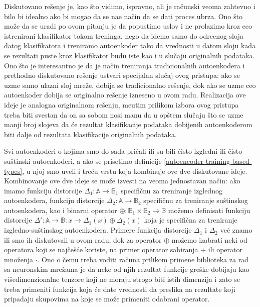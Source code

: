 \documentclass{article}
\begin{document}
	Diskutovano re\v senje je, kao \v sto vidimo, ispravno, ali je ra\v cunski veoma zahtevno i bilo bi idealno ako bi mogao da se na\dj e na\v cin da se dati proces ubrza.
	Ono \v sto mo\v ze da se uradi po ovom pitanju je da popustimo uslov i ne prolazimo kroz ceo istrenirani klasifikator tokom treninga, nego da idemo samo do odre\dj enog sloja datog klasifikatora i treniramo autoenkoder tako da vrednosti u datom sloju kada se rezultati puste kroz klasifikator budu iste kao i u slu\v caju originalnih podataka.
	Ono \v sto je interesantno je da je na\v cin treniranja tradicionalnih autoenkodera i prethodno diskutovano re\v senje ustvari specijalan slu\v caj ovog pristupa: ako se uzme samo ulazni sloj mre\v ze, dobija se tradicionalno re\v senje, dok ako se uzme ceo autoenkoder dobija se originalno re\v senje izneseno u ovom radu. 
	Realizacija ove ideje je analogna originalnom re\v senju, me\dj utim prilikom izbora ovog pristupa treba biti svestan da on sa sobom nosi manu da u op\v stem slu\v caju \v sto se uzme manji broj slojeva da \'ce rezultat klasifikacije podataka dobijenih autoenkoderom biti dalje od rezultata klasifikacije originalnih podataka.
	
	Svi autoenkoderi o kojima smo do sada pri\v cali ili su bili \v cisto izgledni ili \v cisto su\v stinski autoenkoderi, a ako se prisetimo definicije \ref{autoencoder-training-based-types}, u njoj smo uveli i tre\'cu vrstu koja kombinuje ove dve diskutovane ideje. 
	Kombinovanje ove dve ideje se mo\v ze izvesti na veoma jednostavan na\v cin: ako imamo funkciju distorcije $\Delta_1 : \mathbb{A} \to \mathbb{B}_1$ specifi\v cnu za treniranje izglednog autoenkodera, funkciju distorcije $\Delta_2 : \mathbb{A} \to \mathbb{B}_2$ specifi\v cnu za treniranje su\v stinskog autoenkodera, kao i binarni operator $\oplus : \mathbb{B}_1 \times \mathbb{B}_2 \to \mathbb{B}$ mo\v zemo definisati funkciju distorcije $\Delta' : \mathbb{A} \to \mathbb{B} : x \to \Delta_1 (x) \oplus \Delta_2 (x)$ koja je specifi\v cna za treniranje izgledno-su\v stinskog autoenkodera.
	Primere funkcija distorcije $\Delta_1$ i $\Delta_2$ ve\'c znamo ili smo ih diskutovali u ovom radu, dok za operator $\oplus$ mo\v zemo izabrati neki od operatora koji se naj\v ce\v s\'ce koriste, na primer operator sabiranja $+$ ili operator mno\v zenja $\cdot$.
	Ono o \v cemu treba voditi ra\v cuna prilikom primene biblioteka za rad sa neuronskim mre\v zama je da neke od njih rezultat funkcije gre\v ske dobijaju kao vi\v sedimenzionalne tenzore koji ne moraju strogo biti istih dimenzija i zato se treba primeniti funkcija koja \'ce date vrednosti da preslika na rezultate koji pripadaju skupovima na koje se mo\v ze primeniti odabrani operator.
	
\end{document}
